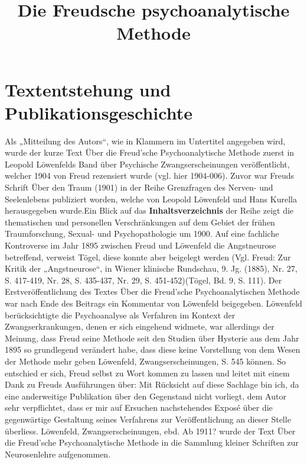 \documentclass[twoside=true,titlepage=false,open=any, parskip=never, fontsize=10pt, headings=small, chapterprefix=false, appendixprefix=false]{scrbook}
\begin{document}
        \title{Die Freudsche psychoanalytische Methode}
        
        \beginnumbering
        
            \section{Textentstehung und Publikationsgeschichte}
            
                  Als „Mitteilung des Autors“, wie in Klammern im
                  Untertitel angegeben wird, wurde der kurze Text Über die Freud’sche
                     Psychoanalytische Methode zuerst in  Leopold Löwenfelds Band über Psychische Zwangserscheinungen veröffentlicht,
                  welcher 1904 von Freud rezensiert wurde (vgl. hier 1904-006).
                  Zuvor war Freuds Schrift Über den Traum (1901) 
                  in der Reihe Grenzfragen des
                  Nerven- und Seelenlebens publiziert worden, welche von Leopold
                  Löwenfeld und Hans Kurella
                  herausgegeben wurde.Ein Blick auf das \textbf{Inhaltsverzeichnis} der Reihe zeigt die thematischen und
                  personellen Verschränkungen auf dem Gebiet der frühen Traumforschung, Sexual- und
                  Psychopathologie um 1900.
                  Auf eine fachliche Kontroverse im Jahr 1895 zwischen
                  Freud und Löwenfeld die Angstneurose betreffend, verweist Tögel, diese konnte aber
                  beigelegt werden (Vgl. Freud: Zur Kritik der
                  „Angstneurose“, in Wiener klinische Rundschau, 9. Jg. (1885), Nr.
                  27, S. 417-419, Nr. 28, S. 435-437, Nr. 29, S. 451-452)(Tögel, Bd. 9, S. 111). 
                  Der Erstveröffentlichung des Textes Über die Freud’sche Psychoanalytischen
                  Methode war nach Ende des Beitrags ein Kommentar von Löwenfeld
                  beigegeben.              
                  Löwenfeld berücksichtigte die Psychoanalyse als Verfahren im Kontext der
                  Zwangserkrankungen, denen er sich eingehend widmete, war allerdings der Meinung,
                  dass Freud seine Methode seit den Studien über Hysterie aus dem Jahr 1895 so
                  grundlegend verändert habe, dass diese keine
                  Vorstellung von dem Wesen der Methode mehr geben
                  Löwenfeld, Zwangserscheinungen, S. 545 können. So
                  entschied er sich, Freud selbst zu Wort kommen zu lassen und leitet mit einem Dank
                  zu Freuds Ausführungen über: Mit Rücksicht auf
                  diese Sachlage bin ich, da eine anderweitige Publikation über den Gegenstand
                  nicht vorliegt, dem Autor sehr verpflichtet, dass er mir auf Ersuchen
                  nachstehendes Exposé über die gegenwärtige Gestaltung seines Verfahrens zur
                  Veröffentlichung an dieser Stelle überliess.
                  Löwenfeld, Zwangserscheinungen, ebd.
                  Ab 1911? wurde der Text Über die Freud’sche Psychoanalytische Methode in die
                     Sammlung kleiner Schriften zur Neurosenlehre aufgenommen.
               
\end{document}
